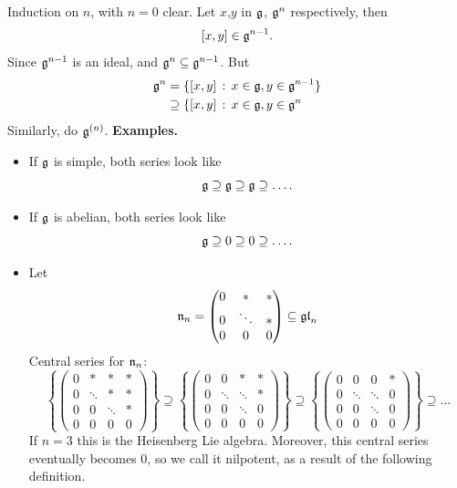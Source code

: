 \documentclass{article}
\begin{document}
\proof Induction on $n$, with $n=0$ clear. Let $x$,$y$ in $\mathfrak{g}$, $\mathfrak{g}^{n}$ respectively, then \[ [x,y] \in \mathfrak{g}^{n-1}.\] Since $\mathfrak{g}^{n-1}$ is an ideal, and $\mathfrak{g}^{n} \subseteq \mathfrak{g}^{n-1}$. But \begin{align*} \mathfrak{g}^{n} &= \{ [x,y] \, : \, x \in \mathfrak{g}, y \in \mathfrak{g}^{n-1} \} \\
    &\supseteq \{ [x,y] \, : \, x \in \mathfrak{g}, y \in \mathfrak{g}^{n}
\end{align*}
Similarly, do $\mathfrak{g}^{(n)}$. \gap \textbf{Examples. }
\begin{itemize}
    \item If $\mathfrak{g}$ is simple, both series look like \[ \mathfrak{g} \supseteq \mathfrak{g} \supseteq \mathfrak{g} \supseteq \dots.\]
    \item If $\mathfrak{g}$ is abelian, both series look like \[\mathfrak{g} \supseteq 0 \supseteq 0 \supseteq \dots.\] 
    \item Let \[ \mathfrak{n}_{n} = \begin{pmatrix}
        0 & * & *\\
        0 & \ddots & *\\
        0 & 0 & 0
    \end{pmatrix} \subseteq \mathfrak{gl}_{n}\]
    Central series for $\mathfrak{n}_{n}$: \[ \left\{ \begin{pmatrix}
        0 & * & * & *\\
        0 & \ddots & * & *\\
        0 & 0 & \ddots & *\\
        0 & 0 & 0 & 0
    \end{pmatrix} \right\} \supseteq \left\{ \begin{pmatrix}
        0 & 0 & * & *\\
        0 & \ddots & \ddots & *\\
        0 & 0 & \ddots & 0\\
        0 & 0 & 0 & 0
    \end{pmatrix} \right\} \supseteq \left\{ \begin{pmatrix}
        0 & 0 & 0 & *\\
        0 & \ddots & \ddots & 0\\
        0 & 0 & \ddots & 0\\
        0 & 0 & 0 & 0
    \end{pmatrix} \right\} \supseteq \dots \] If $n=3$ this is the Heisenberg Lie algebra. Moreover, this central series eventually becomes $0$, so we call it nilpotent, as a result of the following definition.
\end{itemize}
\end{document}
